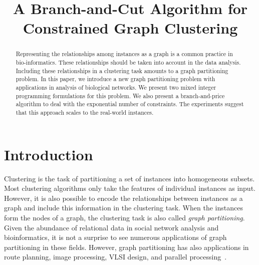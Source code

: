 \documentclass[conference,compsoc]{IEEEtran}
\begin{document}
\title{A Branch-and-Cut Algorithm for Constrained Graph Clustering}

\author{
\and
{}
\and
{}
}

\maketitle

\begin{abstract}
Representing the relationships among instances as a graph is a common practice in bio-informatics. These relationships should be taken into account in the data analysis. Including these relationships in a clustering task amounts to a graph partitioning problem. In this paper, we introduce a new graph partitioning problem with applications in analysis of biological networks. We present two mixed integer programming formulations for this problem. We also present a branch-and-price algorithm to deal with the exponential number of constraints. The experiments suggest that this approach scales to the real-world instances.
\end{abstract}

\section{Introduction}
\label{introduction}

Clustering is the task of partitioning a set of instances into
homogeneous subsets. Most clustering algorithms only take the features
of individual instances as input. However, it is also possible to
encode the relationships between instances as a graph and include this
information in the clustering task. When the instances form the nodes
of a graph, the clustering task is also called \emph{graph
  partitioning}. Given the abundance of relational data in social
network analysis and bioinformatics, it is not a surprise to see
numerous applications of graph partitioning in these fields. However,
graph partitioning has also applications in route planning, image
processing, VLSI design, and parallel processing~\cite{BulucMSS016}.
\end{document}
